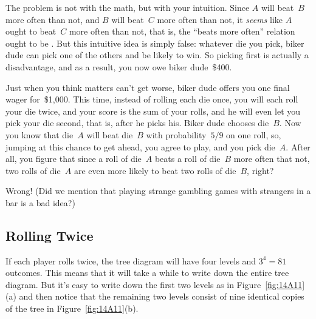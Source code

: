 \iffalse

The tree diagram and outcome probabilities for $B$ versus~$C$ are
shown in Figure~\ref{fig:14A10}.  The data there show that
\emph{die~$B$} wins with probability~$5/9$.

\begin{figure}

\graphic{Fig_A10}

\caption{The tree diagram for one roll of die~$B$ versus die~$C$.
  Die~$B$ wins with probability~$5/9$.}

\label{fig:14A10}

\end{figure}
\fi

The problem is not with the math, but with your intuition.  Since $A$
will beat~$B$ more often than not, and $B$ will beat~$C$ more often
than not, it \emph{seems} like $A$ ought to beat~$C$ more often than
not, that is, the ``beats more often'' relation ought to be
\emph{}.  But this intuitive idea is simply false:
whatever die you pick, biker dude can pick one of the others and be
likely to win.  So picking first is actually a disadvantage, and as a
result, you now owe biker dude~\$400.

Just when you think matters can't get worse, biker dude offers you one
final wager for~\$1,000.  This time, instead of rolling each die once,
you will each roll your die twice, and your score is the sum of your
rolls, and he will even let you pick your die second, that is, after
he picks his.  Biker dude chooses die~$B$.  Now you know that die~$A$
will beat die~$B$ with probability~$5/9$ on one roll, so, jumping at
this chance to get ahead, you agree to play, and you pick
die~$A$.  After all, you figure that since a roll of die~$A$ beats a
roll of die~$B$ more often that not, two rolls of die~$A$ are even
more likely to beat two rolls of die~$B$, right?

Wrong! (Did we mention that playing strange gambling games with
strangers in a bar is a bad idea?)

\subsection{Rolling Twice}

If each player rolls twice, the tree diagram will have four levels and
$3^4 = 81$ outcomes.  This means that it will take a while to write
down the entire tree diagram.  But it's easy to write down the
first two levels as in Figure~\ref{fig:14A11}(a) and
then notice that the remaining two levels consist of nine identical
copies of the tree in Figure~\ref{fig:14A11}(b).

